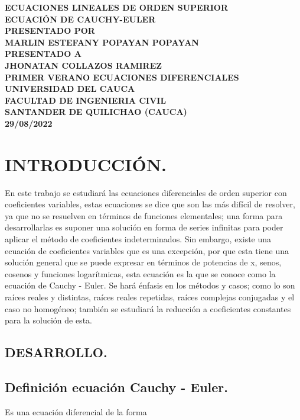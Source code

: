 \documentclass[12pt,letterpaper]{article}
\author{Marlin Estefany Popayan Popayan}
\begin{document}
\begin{center}
\textbf{ECUACIONES LINEALES DE ORDEN SUPERIOR\\
ECUACIÓN DE CAUCHY-EULER}\\
\vspace{3cm}
\textbf{PRESENTADO POR}\\
\textbf{MARLIN ESTEFANY POPAYAN POPAYAN\\} 
\vspace{3cm}
\textbf{PRESENTADO A}\\
\textbf{JHONATAN COLLAZOS RAMIREZ\\}
\vspace{3cm}
\textbf{PRIMER VERANO ECUACIONES DIFERENCIALES}\\
\vspace{1cm}
\textbf{UNIVERSIDAD DEL CAUCA}\\
\vspace{1cm}
\textbf{FACULTAD DE INGENIERIA CIVIL}\\
\vspace{1cm}
\textbf{SANTANDER DE QUILICHAO (CAUCA)}\\
\vspace{3cm}
\textbf{29/08/2022}
\end{center}
\pagebreak
\tableofcontents
\pagebreak
\section{{\normalsize INTRODUCCIÓN.}}
En este trabajo se estudiará las ecuaciones diferenciales de orden superior con coeficientes variables, estas ecuaciones se dice que son las más difícil de resolver, ya que no se resuelven en términos de funciones elementales; una forma para desarrollarlas es suponer una solución en forma de series infinitas para poder aplicar el método de coeficientes indeterminados. Sin embargo, existe una ecuación de coeficientes variables que es una excepción, por que esta tiene una solución general que se puede expresar en términos de potencias de x, senos, cosenos y funciones logarítmicas, esta ecuación es la que se conoce como la ecuación de Cauchy - Euler. Se hará énfasis en los métodos y casos; como lo son raíces reales y distintas, raíces reales repetidas, raíces complejas conjugadas y el caso no homogéneo; también se estudiará la reducción a coeficientes constantes para la solución de esta.\\
\begin{flushleft}
\section{{\normalsize DESARROLLO.}}
\subsection{{\large Definición ecuación Cauchy - Euler.}} Es una ecuación diferencial de la forma\\
\end{flushleft}
\end{document}
